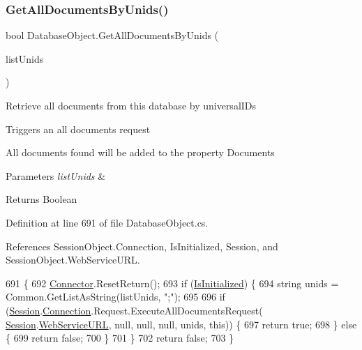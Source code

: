 \subsubsection{\texorpdfstring{Get\+All\+Documents\+By\+Unids()}{GetAllDocumentsByUnids()}\hspace{0.1cm}{\footnotesize\ttfamily [2/2]}}
{\footnotesize\ttfamily bool Database\+Object.\+Get\+All\+Documents\+By\+Unids (\begin{DoxyParamCaption}\item[{I\+List}]{list\+Unids }\end{DoxyParamCaption})}



Retrieve all documents from this database by universal\+I\+Ds 

Triggers an all documents request

All documents found will be added to the property \textquotesingle{}Documents\textquotesingle{}


\begin{DoxyParams}{Parameters}
{\em list\+Unids} & \\
\hline
\end{DoxyParams}
\begin{DoxyReturn}{Returns}
Boolean
\end{DoxyReturn}


Definition at line 691 of file Database\+Object.\+cs.



References Session\+Object.\+Connection, Is\+Initialized, Session, and Session\+Object.\+Web\+Service\+U\+RL.


\begin{DoxyCode}
691                                                         \{
692         \mbox{\hyperlink{class_connector}{Connector}}.ResetReturn();
693         \textcolor{keywordflow}{if} (\mbox{\hyperlink{class_database_object_a5fe036d32a30eb10d1b3f6a30263f740}{IsInitialized}}) \{
694             \textcolor{keywordtype}{string} unids = Common.GetListAsString(listUnids, \textcolor{stringliteral}{";"});
695 
696             \textcolor{keywordflow}{if} (\mbox{\hyperlink{class_database_object_aa8484162b7d2a7c4c9426bca13c64c07}{Session}}.\mbox{\hyperlink{class_session_object_a014bdbf705a753540e19bfb53030c55c}{Connection}}.Request.ExecuteAllDocumentsRequest(
      \mbox{\hyperlink{class_database_object_aa8484162b7d2a7c4c9426bca13c64c07}{Session}}.\mbox{\hyperlink{class_session_object_a697c071c812fbf7ad1166b896fb44c16}{WebServiceURL}}, null, null, null, unids, \textcolor{keyword}{this})) \{
697                 \textcolor{keywordflow}{return} \textcolor{keyword}{true};
698             \} \textcolor{keywordflow}{else} \{
699                 \textcolor{keywordflow}{return} \textcolor{keyword}{false};
700             \}
701         \}
702         \textcolor{keywordflow}{return} \textcolor{keyword}{false};
703     \}
\end{DoxyCode}
\mbox{\label{class_database_object_a9435cc20fe3a92747e509011b7726aff}} 
